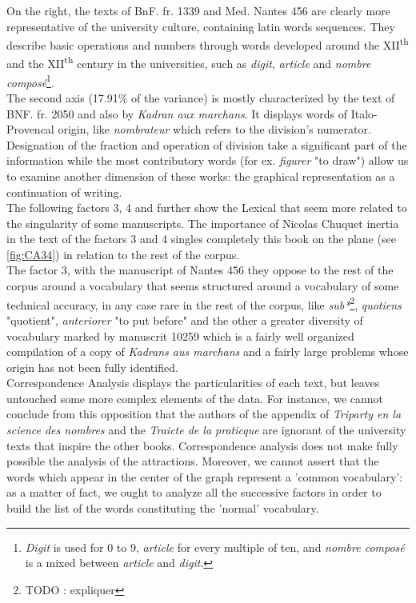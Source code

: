 \documentclass{elsarticle}
\begin{document}
On the right, the texts of BnF. fr. 1339 and Med. Nantes 456 are clearly more representative of the university culture, containing latin words sequences. They describe basic operations and numbers through words developed around the XII\textsuperscript{th} and the XII\textsuperscript{th} century in the universities, such as \textit{digit}, \textit{article} and \textit{nombre compos\'e}\footnote{\textit{Digit} is used for 0 to 9, \textit{article} for every multiple of ten, and \textit{nombre compos\'e} is a mixed between \textit{article} and \textit{digit}.}.\\

The second axis (17.91\% of the variance) is mostly characterized by the text of BNF. fr. 2050 and also by \textit{Kadran aux marchans}. It displays words of Italo-Provencal origin, like \textit{nombrateur} which refers to the division's numerator. Designation of the fraction and operation of division take a significant part of the information while the most contributory words (for ex. \textit{figurer} "to draw") allow us to examine another dimension of these works: the graphical representation as a continuation of writing.\\

The following factors 3, 4 and further show the Lexical that seem more related to the singularity of some manuscripts. The importance of Nicolas Chuquet inertia in the text of the factors 3 and 4 singles completely this book on the plane (see \ref{fig:CA34}) in relation to the rest of the corpus.\\

The factor 3, with the manuscript of Nantes 456 they oppose to the rest of the corpus around a vocabulary that seems structured around a vocabulary of some technical accuracy, in any case rare in the rest of the corpus, like \textit{sub*}\footnote{TODO : expliquer}, \textit{quotiens} "quotient", \textit{anteriorer} "to put before" and the other a greater diversity of vocabulary marked by manuscrit 10259 which is a fairly well organized compilation of a copy of \textit{Kadrans aus marchans} and a fairly large problems whose origin has not been fully identified.\\

Correspondence Analysis displays the particularities of each text, but leaves untouched some more complex elements of the data. For instance, we cannot conclude from this opposition that the authors of the appendix of \textit{Triparty en la science des nombres} and the \textit{Traicte de la praticque} are ignorant of the university texts that inspire the other books. Correspondence analysis does not make fully possible the analysis of the attractions. Moreover, we cannot assert that the words which appear in the center of the graph represent a 'common vocabulary': as a matter of fact, we ought to analyze all the successive factors in order to build the list of the words constituting the 'normal' vocabulary.\\
\end{document}
